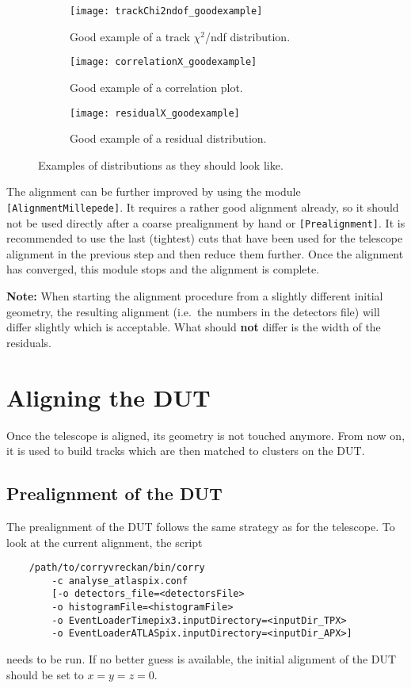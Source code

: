 \begin{figure}
    \centering
    \begin{subfigure}[t]{0.66\textwidth}
        \texttt{[image: trackChi2ndof\_goodexample]}
        \caption{Good example of a track $\chi^2$/ndf distribution.}
        \label{fig:trackChi2}
    \end{subfigure}
    \begin{subfigure}[t]{0.66\textwidth}
        \texttt{[image: correlationX\_goodexample]}
        \caption{Good example of a correlation plot.}
        \label{fig:correlationX}
    \end{subfigure}
    \begin{subfigure}[t]{0.66\textwidth}
        \texttt{[image: residualX\_goodexample]}
        \caption{Good example of a residual distribution.}
        \label{fig:residualX}
    \end{subfigure}
    \caption{Examples of distributions as they should look like.}
    \label{fig:exampleAlignment}
\end{figure}

The alignment can be further improved by using the module \texttt{[AlignmentMillepede]}.
It requires a rather good alignment already, so it should not be used directly after a coarse prealignment by hand or \texttt{[Prealignment]}.
It is recommended to use the last (tightest) cuts that have been used for the telescope alignment in the previous step and then reduce them further.
Once the alignment has converged, this module stops and the alignment is complete.

\textbf{Note:} When starting the alignment procedure from a slightly different initial geometry, the resulting alignment (i.e.~the numbers in the detectors file) will differ slightly which is acceptable. What should \textbf{not} differ is the width of the residuals.

\section{Aligning the DUT}
\label{sec:align_dut}
Once the telescope is aligned, its geometry is not touched anymore. From now on, it is used to build tracks which are then matched to clusters on the DUT.

\subsection*{Prealignment of the DUT}
The prealignment of the DUT follows the same strategy as for the telescope. To look at the current alignment, the script
\begin{verbatim}
    /path/to/corryvreckan/bin/corry 
    	-c analyse_atlaspix.conf 
    	[-o detectors_file=<detectorsFile> 
    	-o histogramFile=<histogramFile> 
    	-o EventLoaderTimepix3.inputDirectory=<inputDir_TPX>
    	-o EventLoaderATLASpix.inputDirectory=<inputDir_APX>]
\end{verbatim}
needs to be run.
If no better guess is available, the initial alignment of the DUT should be set to $x=y=z=0$.

